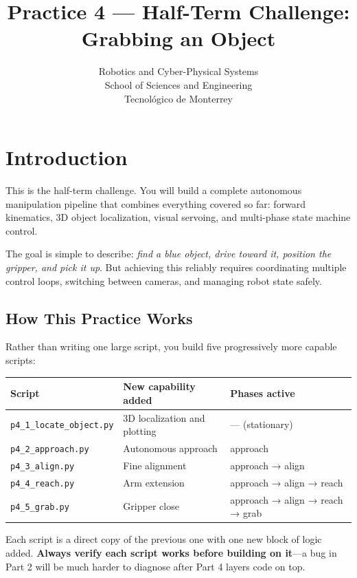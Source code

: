 \documentclass[11pt,a4paper]{article}
\title{\textbf{Practice 4 --- Half-Term Challenge: Grabbing an Object}}
\author{
    Robotics and Cyber-Physical Systems \\
    School of Sciences and Engineering \\
    Tecnol\'ogico de Monterrey
}
\date{}
\begin{document}
\maketitle

\section*{Introduction}

This is the half-term challenge. You will build a complete autonomous manipulation pipeline that combines everything covered so far: forward kinematics, 3D object localization, visual servoing, and multi-phase state machine control.

The goal is simple to describe: \emph{find a blue object, drive toward it, position the gripper, and pick it up}. But achieving this reliably requires coordinating multiple control loops, switching between cameras, and managing robot state safely.

\subsection*{How This Practice Works}

Rather than writing one large script, you build five progressively more capable scripts:

\begin{center}
\begin{tabular}{lll}
\hline
\textbf{Script} & \textbf{New capability added} & \textbf{Phases active} \\
\hline
\texttt{p4\_1\_locate\_object.py} & 3D localization and plotting & --- (stationary) \\
\texttt{p4\_2\_approach.py}       & Autonomous approach          & approach \\
\texttt{p4\_3\_align.py}          & Fine alignment               & approach → align \\
\texttt{p4\_4\_reach.py}          & Arm extension                & approach → align → reach \\
\texttt{p4\_5\_grab.py}           & Gripper close                & approach → align → reach → grab \\
\hline
\end{tabular}
\end{center}

Each script is a direct copy of the previous one with one new block of logic added. \textbf{Always verify each script works before building on it}---a bug in Part 2 will be much harder to diagnose after Part 4 layers code on top.
\end{document}
